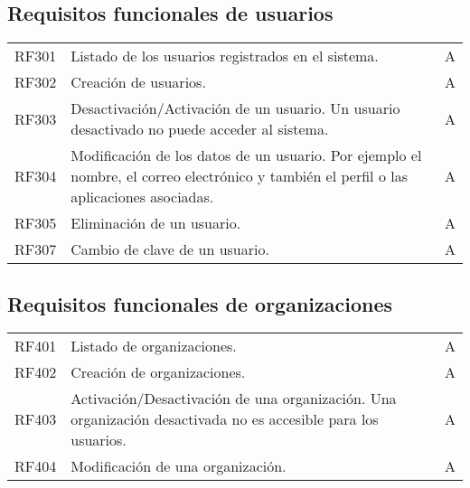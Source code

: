 \subsection{Requisitos funcionales de usuarios}
\begin{table}[hbt!]
  \setlength\extrarowheight{14pt}
  \centering
  \begin{tabularx}{\textwidth}{cXc}
    RF301\label{RF301} & Listado de los usuarios registrados en el sistema. & A \\
    RF302\label{RF302} & Creación de usuarios. & A \\
    RF303\label{RF303} & Desactivación/Activación de un usuario. Un usuario desactivado no puede acceder al sistema. & A \\
    RF304\label{RF304} & Modificación de los datos de un usuario. Por ejemplo el nombre, el correo electrónico y también el perfil o las aplicaciones asociadas. & A \\
    RF305\label{RF305} & Eliminación de un usuario. & A \\
    RF307\label{RF307} & Cambio de clave de un usuario. & A \\
  \end{tabularx}
  \label{cuadro:requisitos-de-usuarios}
\end{table}
\FloatBarrier

\subsection{Requisitos funcionales de organizaciones}
\begin{table}[hbt!]
  \centering
  \setlength\extrarowheight{14pt}
  \begin{tabularx}{\textwidth}{cXc}
    RF401\label{RF401} & Listado de organizaciones. & A \\
    RF402\label{RF402} & Creación de organizaciones. & A \\
    RF403\label{RF403} & Activación/Desactivación de una organización. Una organización desactivada no es accesible para los usuarios. & A \\
    RF404\label{RF404} & Modificación de una organización. & A \\
  \end{tabularx}
  \label{cuadro:requisitos-de-organizaciones}
\end{table}
\FloatBarrier


